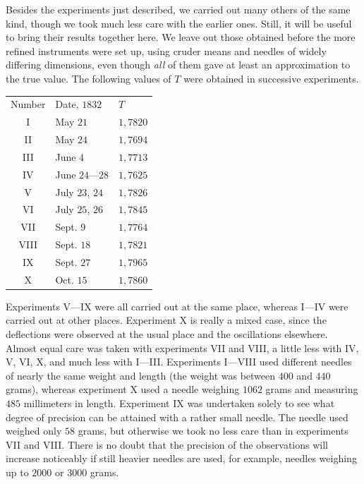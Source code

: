 Besides the experiments just described, we carried out many others of the same kind, though we took much less care with the earlier ones. Still, it will be useful to bring their results together here. We leave out those obtained before the more refined instruments were set up, using cruder means and needles of widely differing dimensions, even though \textit{all} of them gave at least an approximation to the true value. The following values of $T$ were obtained in successive experiments.
\begin{center}
\begin{tabular}{c|l|l}
Number&Date, $1832$&$T$\\
I&May $21$&$1{,}7820$\\
II&May $24$&$1{,}7694$\\
III&June $4$&$1{,}7713$\\
IV&June $24$—$28$&$1{,}7625$\\
V&July $23$, $24$&$1{,}7826$\\
VI&July $25$, $26$&$1{,}7845$\\
VII&Sept. $9$&$1{,}7764$\\
VIII&Sept. $18$&$1{,}7821$\\
IX&Sept. $27$&$1{,}7965$\\
X&Oct. $15$&$1{,}7860$
\end{tabular}
\end{center}
Experiments V—IX were all carried out at the same place, whereas I—IV were carried out at other places. Experiment X is really a mixed case, since the deflections were observed at the usual place and the oscillations elsewhere. Almost equal care was taken with experiments VII and VIII, a little less with IV, V, VI, X, and much less with I—III. Experiments I—VIII used different needles of nearly the same weight and length (the weight was between $400$ and $440$ grams), whereas experiment X used a needle weighing $1062$ grams and measuring $485$ millimeters in length. Experiment IX was undertaken solely to see what degree of precision can be attained with a rather small needle. The needle used weighed only $58$ grams, but otherwise we took no less care than in experiments VII and VIII. There is no doubt that the precision of the observations will increase noticeably if still heavier needles are used, for example, needles weighing up to $2000$ or $3000$ grams.

